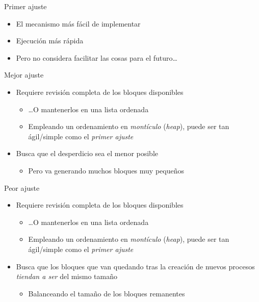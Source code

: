 \documentclass[presentation]{beamer}
\begin{document}
\begin{frame}[label={sec:orgb762b49}]{Primer ajuste}
\begin{itemize}
\item El mecanismo más fácil de implementar
\item Ejecución más rápida
\item Pero no considera facilitar las cosas para el futuro\ldots{}
\end{itemize}
\end{frame}
\begin{frame}[label={sec:org2848b5b}]{Mejor ajuste}
\begin{itemize}
\item Requiere revisión completa de los bloques disponibles
\begin{itemize}
\item \ldots{}O mantenerlos en una lista ordenada
\item Empleando un ordenamiento en \emph{montículo} (\emph{heap}), puede ser tan
ágil/simple como el \emph{primer ajuste}
\end{itemize}
\item Busca que el desperdicio sea el menor posible
\begin{itemize}
\item Pero va generando muchos bloques muy pequeños
\end{itemize}
\end{itemize}
\end{frame}

\begin{frame}[label={sec:org2256e4d}]{Peor ajuste}
\begin{itemize}
\item Requiere revisión completa de los bloques disponibles
\begin{itemize}
\item \ldots{}O mantenerlos en una lista ordenada
\item Empleando un ordenamiento en \emph{montículo} (\emph{heap}), puede ser tan
ágil/simple como el \emph{primer ajuste}
\end{itemize}
\item Busca que los bloques que van quedando tras la creación de nuevos
procesos \emph{tiendan a ser} del mismo tamaño
\begin{itemize}
\item Balanceando el tamaño de los bloques remanentes
\end{itemize}
\end{itemize}
\end{frame}
\end{document}
